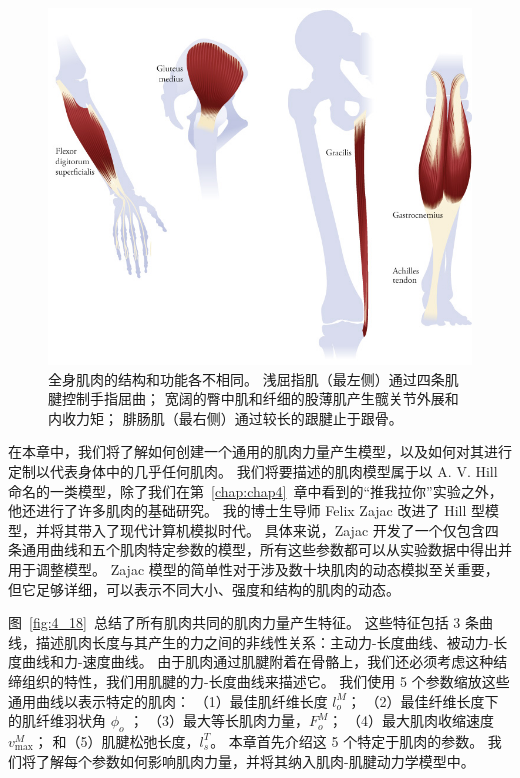 \begin{figure}[!htb]
	\centering
	\includegraphics[width=1.0\linewidth]{chap5/5_1}
	\caption{全身肌肉的结构和功能各不相同。
		浅屈指肌（最左侧）通过四条肌腱控制手指屈曲；
		宽阔的臀中肌和纤细的股薄肌产生髋关节外展和内收力矩；
		腓肠肌（最右侧）通过较长的跟腱止于跟骨。 \label{fig:5_1}}
\end{figure}


在本章中，我们将了解如何创建一个通用的肌肉力量产生模型，以及如何对其进行定制以代表身体中的几乎任何肌肉。
我们将要描述的肌肉模型属于以 A. V. Hill 命名的一类模型，除了我们在第~\ref{chap:chap4}~章中看到的“推我拉你”实验之外，他还进行了许多肌肉的基础研究。
我的博士生导师 Felix Zajac 改进了 Hill 型模型，并将其带入了现代计算机模拟时代\cite{zajac1989muscle}。
具体来说，Zajac 开发了一个仅包含四条通用曲线和五个肌肉特定参数的模型，所有这些参数都可以从实验数据中得出并用于调整模型。
Zajac 模型的简单性对于涉及数十块肌肉的动态模拟至关重要，但它足够详细，可以表示不同大小、强度和结构的肌肉的动态。


图~\ref{fig:4_18}~总结了所有肌肉共同的肌肉力量产生特征。
这些特征包括 3 条曲线，描述肌肉长度与其产生的力之间的非线性关系：主动力-长度曲线、被动力-长度曲线和力-速度曲线。
由于肌肉通过肌腱附着在骨骼上，我们还必须考虑这种结缔组织的特性，我们用肌腱的力-长度曲线来描述它。
我们使用 5 个参数缩放这些通用曲线以表示特定的肌肉：
（1）最佳肌纤维长度 $l_o^M$；
（2）最佳纤维长度下的肌纤维羽状角 $\phi_o$ ；
（3）最大等长肌肉力量，$F_o^M$；
（4）最大肌肉收缩速度 $v_\text{max}^M$；
和（5）肌腱松弛长度，$l_s^T$。
本章首先介绍这 5 个特定于肌肉的参数。
我们将了解每个参数如何影响肌肉力量，并将其纳入肌肉-肌腱动力学模型中。


